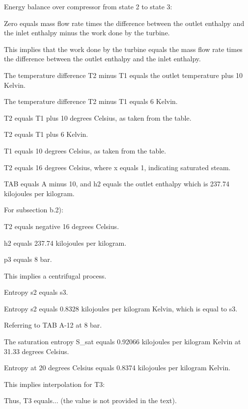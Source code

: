 Energy balance over compressor from state 2 to state 3:

Zero equals mass flow rate times the difference between the outlet enthalpy and the inlet enthalpy minus the work done by the turbine.

This implies that the work done by the turbine equals the mass flow rate times the difference between the outlet enthalpy and the inlet enthalpy.

The temperature difference T2 minus T1 equals the outlet temperature plus 10 Kelvin.

The temperature difference T2 minus T1 equals 6 Kelvin.

T2 equals T1 plus 10 degrees Celsius, as taken from the table.

T2 equals T1 plus 6 Kelvin.

T1 equals 10 degrees Celsius, as taken from the table.

T2 equals 16 degrees Celsius, where x equals 1, indicating saturated steam.

TAB equals A minus 10, and h2 equals the outlet enthalpy which is 237.74 kilojoules per kilogram.

For subsection b.2):

T2 equals negative 16 degrees Celsius.

h2 equals 237.74 kilojoules per kilogram.

p3 equals 8 bar.

This implies a centrifugal process.

Entropy s2 equals s3.

Entropy s2 equals 0.8328 kilojoules per kilogram Kelvin, which is equal to s3.

Referring to TAB A-12 at 8 bar.

The saturation entropy S_sat equals 0.92066 kilojoules per kilogram Kelvin at 31.33 degrees Celsius.

Entropy at 20 degrees Celsius equals 0.8374 kilojoules per kilogram Kelvin.

This implies interpolation for T3:

Thus, T3 equals... (the value is not provided in the text).